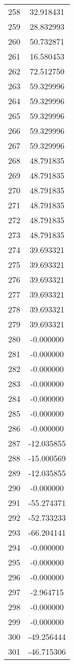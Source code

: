 \documentclass[12pt]{article}
\begin{document}
\begin{longtable}{@{}cc@{}}
258 & 32.918431 \\
259 & 28.832993 \\
260 & 50.732871 \\
261 & 16.580453 \\
262 & 72.512750 \\
263 & 59.329996 \\
264 & 59.329996 \\
265 & 59.329996 \\
266 & 59.329996 \\
267 & 59.329996 \\
268 & 48.791835 \\
269 & 48.791835 \\
270 & 48.791835 \\
271 & 48.791835 \\
272 & 48.791835 \\
273 & 48.791835 \\
274 & 39.693321 \\
275 & 39.693321 \\
276 & 39.693321 \\
277 & 39.693321 \\
278 & 39.693321 \\
279 & 39.693321 \\
280 & -0.000000 \\
281 & -0.000000 \\
282 & -0.000000 \\
283 & -0.000000 \\
284 & -0.000000 \\
285 & -0.000000 \\
286 & -0.000000 \\
287 & -12.035855 \\
288 & -15.000569 \\
289 & -12.035855 \\
290 & -0.000000 \\
291 & -55.274371 \\
292 & -52.733233 \\
293 & -66.204141 \\
294 & -0.000000 \\
295 & -0.000000 \\
296 & -0.000000 \\
297 & -2.964715 \\
298 & -0.000000 \\
299 & -0.000000 \\
300 & -49.256444 \\
301 & -46.715306 \\

\end{longtable}
\end{document}
